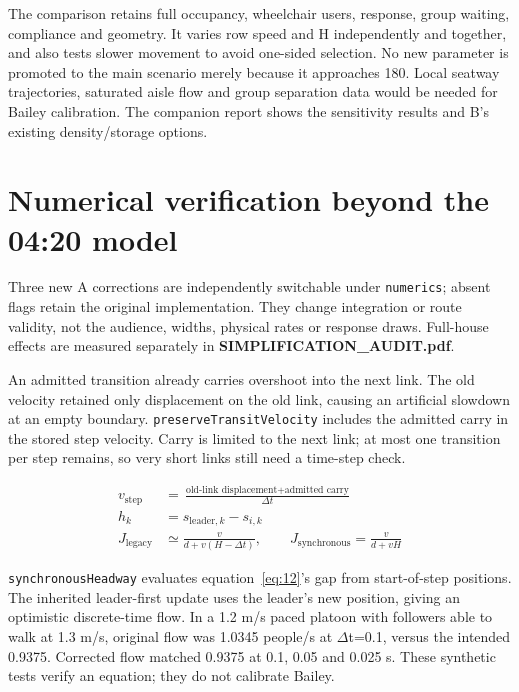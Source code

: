 \documentclass[11pt,a4paper]{article}
\newcommand{\code}[1]{{\small\nolinkurl{#1}}}
\begin{document}
The comparison retains full occupancy, wheelchair users, response, group waiting, compliance and geometry. It varies row speed and H independently and together, and also tests slower movement to avoid one-sided selection. No new parameter is promoted to the main scenario merely because it approaches 180. Local seatway trajectories, saturated aisle flow and group separation data would be needed for Bailey calibration. The companion report shows the sensitivity results and B's existing density/storage options.


\section{Numerical verification beyond the 04:20 model}\label{sec:18}

Three new A corrections are independently switchable under \code{numerics}; absent flags retain the original implementation. They change integration or route validity, not the audience, widths, physical rates or response draws. Full-house effects are measured separately in \textbf{SIMPLIFICATION\_AUDIT.pdf}.


An admitted transition already carries overshoot into the next link. The old velocity retained only displacement on the old link, causing an artificial slowdown at an empty boundary. \code{preserveTransitVelocity} includes the admitted carry in the stored step velocity. Carry is limited to the next link; at most one transition per step remains, so very short links still need a time-step check.


\begin{equation}
\begin{aligned}
v_{\mathrm{step}}&=\frac{\text{old-link displacement}+\text{admitted carry}}{\Delta t} \\
h_k&=s_{\mathrm{leader},k}-s_{i,k} \\
J_{\mathrm{legacy}}&\simeq\frac{v}{d+v(H-\Delta t)},\qquad J_{\mathrm{synchronous}}=\frac{v}{d+vH}
\end{aligned}
\tag{22}\label{eq:22}
\end{equation}

\code{synchronousHeadway} evaluates equation~\eqref{eq:12}'s gap from start-of-step positions. The inherited leader-first update uses the leader's new position, giving an optimistic discrete-time flow. In a 1.2 m/s paced platoon with followers able to walk at 1.3 m/s, original flow was 1.0345 people/s at \ensuremath{\Delta}t=0.1, versus the intended 0.9375. Corrected flow matched 0.9375 at 0.1, 0.05 and 0.025 s. These synthetic tests verify an equation; they do not calibrate Bailey.
\end{document}

